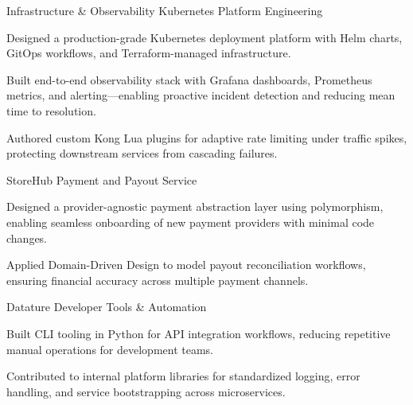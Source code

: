 
\begin{cventries}
  \cventry
    {Infrastructure \& Observability}
    {Kubernetes Platform Engineering}
    {}
    {}
    {
      \begin{cvitems}
        \item {Designed a production-grade Kubernetes deployment platform with Helm charts, GitOps workflows, and Terraform-managed infrastructure.}
        \item {Built end-to-end observability stack with Grafana dashboards, Prometheus metrics, and alerting---enabling proactive incident detection and reducing mean time to resolution.}
        \item {Authored custom Kong Lua plugins for adaptive rate limiting under traffic spikes, protecting downstream services from cascading failures.}
      \end{cvitems}
    }

  \cventry
    {StoreHub}
    {Payment and Payout Service}
    {}
    {}
    {
      \begin{cvitems}
        \item {Designed a provider-agnostic payment abstraction layer using polymorphism, enabling seamless onboarding of new payment providers with minimal code changes.}
        \item {Applied Domain-Driven Design to model payout reconciliation workflows, ensuring financial accuracy across multiple payment channels.}
      \end{cvitems}
    }

  \cventry
    {Datature}
    {Developer Tools \& Automation}
    {}
    {}
    {
      \begin{cvitems}
        \item {Built CLI tooling in Python for API integration workflows, reducing repetitive manual operations for development teams.}
        \item {Contributed to internal platform libraries for standardized logging, error handling, and service bootstrapping across microservices.}
      \end{cvitems}
    }
\end{cventries}
